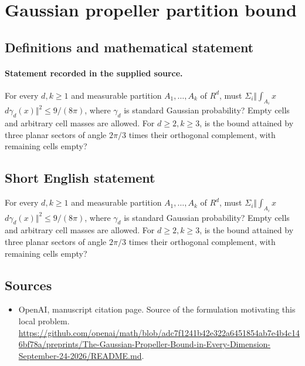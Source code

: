 \documentclass[11pt]{article}
\begin{document}
\section*{Gaussian propeller partition bound}\label{30007119}
\subsection{Definitions and mathematical statement}
\paragraph{Statement recorded in the supplied source.}
For every $d,k\geq 1$ and measurable partition $A_{1},\dots ,A_k$ of $R^{d}$, must $\Sigma _i\Vert \int _{A_i}x$ $d\gamma _d(x)\Vert ^{2}\leq 9/(8\pi )$, where $\gamma _d$ is standard Gaussian probability? Empty cells and arbitrary cell masses are allowed. For $d\geq 2,k\geq 3$, is the bound attained by three planar sectors of angle $2\pi /3$ times their orthogonal complement, with remaining cells empty?
\subsection{Short English statement}
For every $d,k\geq 1$ and measurable partition $A_{1},\dots ,A_k$ of $R^{d}$, must $\Sigma _i\Vert \int _{A_i}x$ $d\gamma _d(x)\Vert ^{2}\leq 9/(8\pi )$, where $\gamma _d$ is standard Gaussian probability? Empty cells and arbitrary cell masses are allowed. For $d\geq 2,k\geq 3$, is the bound attained by three planar sectors of angle $2\pi /3$ times their orthogonal complement, with remaining cells empty?
\subsection{Sources}
\begin{itemize}
\item[S1] OpenAI, manuscript citation page. Source of the formulation motivating this local problem.
\url{https://github.com/openai/math/blob/adc7f1241b42e322a6451854ab7e4b4c146bf78a/preprints/The-Gaussian-Propeller-Bound-in-Every-Dimension-September-24-2026/README.md}.
\end{itemize}
\end{document}
